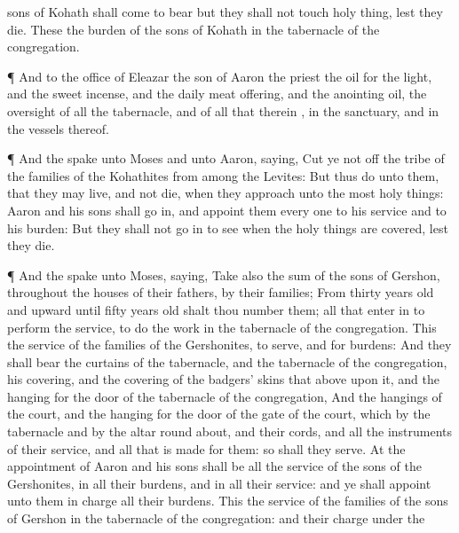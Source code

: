 {sons of
Kohath shall
come to
bear
{} but they shall not
touch
{} holy
thing, lest they
die. These
{} the
burden of the
sons of
Kohath in the
tabernacle of the
congregation.
\par }{\PP {}¶ And to the
office of
Eleazar the
son of
Aaron the
priest
{} the
oil for the
light, and the
sweet
incense, and the
daily meat
offering, and the
anointing
oil,
{} the
oversight of all the
tabernacle, and of all that therein
{}, in the
sanctuary, and in the
vessels thereof.
\par }{\PP {}¶ And the
{}
spake unto
Moses and unto
Aaron,
saying,
Cut ye not
off the
tribe of the
families of the
Kohathites from
among the
Levites:
But thus
do unto them, that they may
live, and not
die, when they
approach unto the
most holy
things:
Aaron and his
sons shall go
in, and
appoint them
every
one to his
service and to his
burden:
But they shall not go
in to
see when the holy
things are
covered, lest they
die.
\par }{\PP {}¶ And the
{}
spake unto
Moses,
saying,
Take also the
sum of the
sons of
Gershon, throughout the
houses of their
fathers, by their
families;
From
thirty
years
old and
upward until
fifty
years
old shalt thou
number them; all that enter
in to
perform the
service, to
do the
work in the
tabernacle of the
congregation.
This
{} the
service of the
families of the
Gershonites, to
serve, and for
burdens:
And they shall
bear the
curtains of the
tabernacle, and the
tabernacle of the
congregation, his
covering, and the
covering of the
badgers’ skins that
{}
above upon it, and the
hanging for the
door of the
tabernacle of the
congregation,
And the
hangings of the
court, and the
hanging for the
door of the
gate of the
court, which
{} by the
tabernacle and by the
altar round
about, and their
cords, and all the
instruments of their
service, and all that is
made for them: so shall they
serve.
At the
appointment of
Aaron and his
sons shall be all the
service of the
sons of the
Gershonites, in all their
burdens, and in all their
service: and ye shall
appoint unto them in
charge all their
burdens.
This
{} the
service of the
families of the
sons of
Gershon in the
tabernacle of the
congregation: and their
charge
{} under the
}
